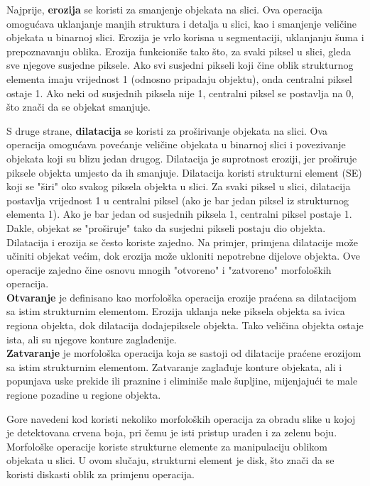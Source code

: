 \documentclass[a4paper,12pt]{article}
\begin{document}
Najprije, \textbf{erozija} se koristi za smanjenje objekata na slici. Ova operacija omogućava uklanjanje manjih struktura i detalja u slici, kao i smanjenje veličine objekata u binarnoj slici.
Erozija je vrlo korisna u segmentaciji, uklanjanju šuma i prepoznavanju oblika. 
Erozija funkcioniše tako što, za svaki piksel u slici, gleda sve njegove susjedne piksele. 
Ako svi susjedni pikseli koji čine oblik strukturnog elementa imaju vrijednost 1 (odnosno pripadaju objektu), onda centralni piksel ostaje 1. Ako neki od susjednih piksela nije 1, centralni piksel se postavlja na 0, što znači da se objekat smanjuje.

S druge strane, \textbf{dilatacija} se koristi za proširivanje objekata na slici. 
Ova operacija omogućava povećanje veličine objekata u binarnoj slici i povezivanje objekata koji su blizu jedan drugog. 
Dilatacija je suprotnost eroziji, jer proširuje piksele objekta umjesto da ih smanjuje. 
Dilatacija koristi strukturni element (SE) koji se "širi" oko svakog piksela objekta u slici. 
Za svaki piksel u slici, dilatacija postavlja vrijednost 1 u centralni piksel (ako je bar jedan piksel iz strukturnog elementa 1). 
Ako je bar jedan od susjednih piksela 1, centralni piksel postaje 1. 
Dakle, objekat se "proširuje" tako da susjedni pikseli postaju dio objekta. 
\\
Dilatacija i erozija se često koriste zajedno. Na primjer, primjena dilatacije može učiniti objekat većim, dok erozija može ukloniti nepotrebne dijelove objekta.
 Ove operacije zajedno čine osnovu mnogih "otvoreno" i "zatvoreno" morfoloških operacija. \\

\textbf{Otvaranje} je definisano kao morfološka operacija erozije praćena sa dilatacijom sa istim strukturnim elementom. 
Erozija uklanja neke piksela objekta sa ivica regiona objekta, dok dilatacija dodajepiksele objekta. Tako veličina objekta ostaje ista, ali su njegove konture zaglađenije. \\

\textbf{Zatvaranje} je morfološka operacija koja se sastoji od dilatacije praćene erozijom sa istim strukturnim elementom. 
Zatvaranje zaglađuje konture objekata, ali i popunjava uske prekide ili praznine i eliminiše male šupljine, mijenjajući te male regione pozadine u regione objekta.

Gore navedeni kod koristi nekoliko morfoloških operacija za obradu slike u kojoj je detektovana crvena boja, pri čemu je isti pristup urađen i za zelenu boju. 
Morfološke operacije koriste strukturne elemente za manipulaciju oblikom objekata u slici. 
U ovom slučaju, strukturni element je disk, što znači da se koristi diskasti oblik za primjenu operacija.
\\
\end{document}
